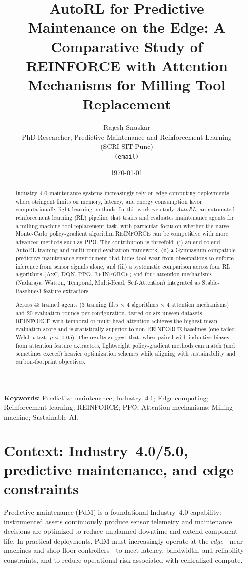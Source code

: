 \documentclass[11pt]{article}
\title{AutoRL for Predictive Maintenance on the Edge: \texorpdfstring{\newline}{ }A Comparative Study of REINFORCE with Attention Mechanisms for Milling Tool Replacement}
\author{Rajesh Siraskar\\
\small PhD Researcher, Predictive Maintenance and Reinforcement Learning\\
\small (SCRI SIT Pune)\\
\small \texttt{(email)}
}
\date{\today}
\begin{document}
\maketitle

\begin{abstract}
Industry~4.0 maintenance systems increasingly rely on edge-computing deployments where stringent limits on memory, latency, and energy consumption favor computationally light learning methods. In this work we study \emph{AutoRL}, an automated reinforcement learning (RL) pipeline that trains and evaluates maintenance agents for a milling machine tool-replacement task, with particular focus on whether the na\"{i}ve Monte-Carlo policy-gradient algorithm \textsc{REINFORCE} can be competitive with more advanced methods such as \textsc{PPO}. The contribution is threefold: (i) an end-to-end AutoRL training and multi-round evaluation framework, (ii) a Gymnasium-compatible predictive-maintenance environment that hides tool wear from observations to enforce inference from sensor signals alone, and (iii) a systematic comparison across four RL algorithms (\textsc{A2C}, \textsc{DQN}, \textsc{PPO}, \textsc{REINFORCE}) and four attention mechanisms (Nadaraya--Watson, Temporal, Multi-Head, Self-Attention) integrated as Stable-Baselines3 feature extractors.

Across 48 trained agents (3 training files $\times$ 4 algorithms $\times$ 4 attention mechanisms) and 20 evaluation rounds per configuration, tested on six unseen datasets, \textsc{REINFORCE} with temporal or multi-head attention achieves the highest mean evaluation score and is statistically superior to non-\textsc{REINFORCE} baselines (one-tailed Welch $t$-test, $p\ll 0.05$). The results suggest that, when paired with inductive biases from attention feature extractors, lightweight policy-gradient methods can match (and sometimes exceed) heavier optimization schemes while aligning with sustainability and carbon-footprint objectives.
\end{abstract}

\textbf{Keywords:} Predictive maintenance; Industry~4.0; Edge computing; Reinforcement learning; \textsc{REINFORCE}; \textsc{PPO}; Attention mechanisms; Milling machine; Sustainable AI.

\section{Context: Industry~4.0/5.0, predictive maintenance, and edge constraints}
Predictive maintenance (PdM) is a foundational Industry~4.0 capability: instrumented assets continuously produce sensor telemetry and maintenance decisions are optimized to reduce unplanned downtime and extend component life. In practical deployments, PdM must increasingly operate at the \emph{edge}---near machines and shop-floor controllers---to meet latency, bandwidth, and reliability constraints, and to reduce operational risk associated with centralized compute.
\end{document}
